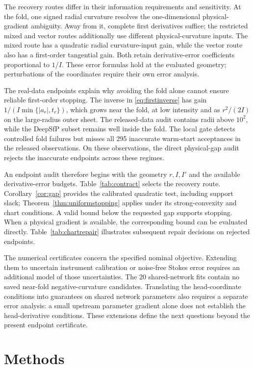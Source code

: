\documentclass[10pt,a4paper]{article}
\begin{document}
The recovery routes differ in their information requirements and sensitivity. At the fold, one signed radial curvature resolves the one-dimensional physical-gradient ambiguity. Away from it, complete first derivatives suffice; the restricted mixed and vector routes additionally use different physical-curvature inputs. The mixed route has a quadratic radial curvature-input gain, while the vector route also has a first-order tangential gain. Both retain derivative-error coefficients proportional to $1/I$. These error formulas hold at the evaluated geometry; perturbations of the coordinates require their own error analysis.

The real-data endpoints explain why avoiding the fold alone cannot ensure reliable first-order stopping. The inverse in \eqref{eq:firstinverse} has gain $1/(I\min\{|a_r|,t_r\})$, which grows near the fold, at low intensity and as $r^2/(2I)$ on the large-radius outer sheet. The released-data audit contains radii above $10^2$, while the DeepSfP subset remains well inside the fold. The local gate detects controlled fold failures but misses all 295 inaccurate warm-start acceptances in the released observations. On these observations, the direct physical-gap audit rejects the inaccurate endpoints across these regimes.

An endpoint audit therefore begins with the geometry $r,I,I'$ and the available derivative-error budgets. Table~\ref{tab:contract} selects the recovery route. Corollary~\ref{cor:gap} provides the calibrated quadratic test, including support slack; Theorem~\ref{thm:uniformstopping} applies under its strong-convexity and chart conditions. A valid bound below the requested gap supports stopping. When a physical gradient is available, the corresponding bound can be evaluated directly. Table~\ref{tab:chartrepair} illustrates subsequent repair decisions on rejected endpoints.

The numerical certificates concern the specified nominal objective. Extending them to uncertain instrument calibration or noise-free Stokes error requires an additional model of those uncertainties. The 20 shared-network fits contain no saved near-fold negative-curvature candidates. Translating the head-coordinate conditions into guarantees on shared network parameters also requires a separate error analysis: a small upstream parameter gradient alone does not establish the head-derivative conditions. These extensions define the next questions beyond the present endpoint certificate.


\section{Methods}
\label{sec:methods}
\end{document}
